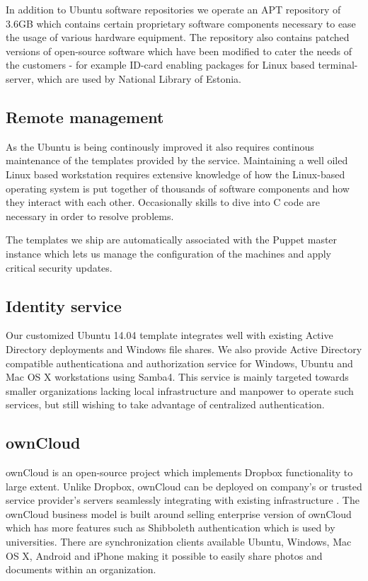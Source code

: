 \documentclass{article}
\begin{document}
In addition to Ubuntu software repositories 
we operate an APT repository of 3.6GB which contains
certain proprietary software components necessary
to ease the usage of various hardware equipment.
The repository also contains patched versions of
open-source software which have been modified to cater the
needs of the customers - for example
ID-card enabling packages for Linux based terminal-server,
which are used by National Library of Estonia.

\subsection{Remote management}

As the Ubuntu is being continously improved it also requires
continous maintenance of the templates provided by the service.
Maintaining a well oiled Linux based workstation
requires extensive knowledge of
how the Linux-based operating system is put together of 
thousands of software components and how they interact with each other.
Occasionally skills to dive into C code are necessary
in order to resolve problems.

The templates we ship are automatically associated with
the Puppet master instance which lets us manage
the configuration of the machines and apply critical security updates.


\subsection{Identity service}

Our customized Ubuntu 14.04 template integrates
well with existing Active Directory deployments
and Windows file shares.
We also provide Active Directory compatible
authenticationa and authorization service
for Windows, Ubuntu and Mac OS X workstations using Samba4.
This service is mainly targeted towards
smaller organizations lacking local
infrastructure and manpower to operate such services,
but still wishing to take advantage of centralized
authentication.

\subsection{ownCloud}

ownCloud
is an open-source project which implements
Dropbox functionality to large extent.
Unlike Dropbox, ownCloud can be deployed
on company's or trusted service provider's servers
seamlessly integrating with existing infrastructure
\cite{deploying-owncloud}.
The ownCloud business model is built around selling
enterprise version of ownCloud which has more features
such as Shibboleth authentication which is used by universities.
\cite{owncloud-closes-2.5-million-usd}
There are synchronization clients available
Ubuntu, Windows, Mac OS X, Android and iPhone
making it possible to easily share photos and documents within
an organization.
\end{document}
